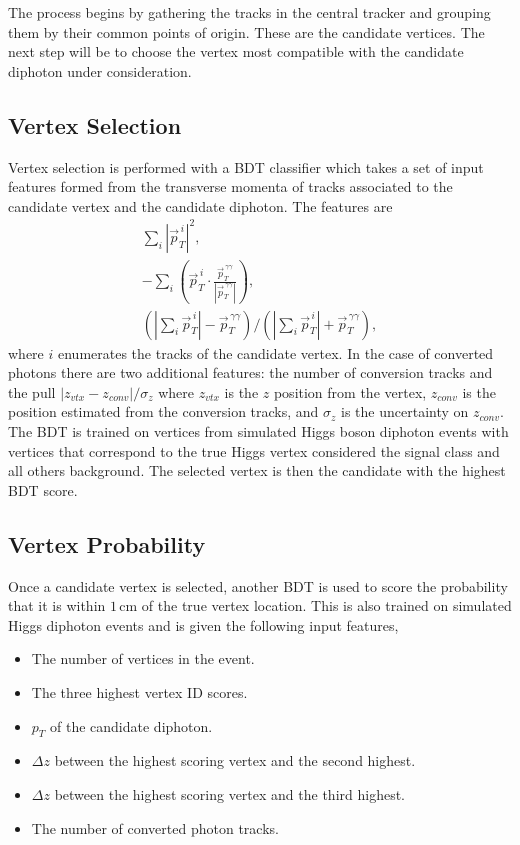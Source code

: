 The process begins by gathering the tracks in the central tracker and grouping them by their common points of origin. These are the candidate vertices. The next step will be to choose the vertex most compatible with the candidate diphoton under consideration.

\subsection{Vertex Selection}
Vertex selection is performed with a BDT classifier which takes a set of input features formed from the transverse momenta of tracks associated to the candidate vertex and the candidate diphoton. The features are
\begin{gather*}
    \sum_{i}|\vec{p}_{T}^{\,i}|^{2}, \\
    -\sum_{i}(\vec{p}_{T}^{\,i}\cdot\frac{\vec{p}_{T}^{\,\gamma\gamma}}{|\vec{p}_{T}^{\,\gamma\gamma}|}), \\
    (|\sum_{i}\vec{p}_{T}^{\,i}|-\vec{p}_{T}^{\,\gamma\gamma})/(|\sum_{i}\vec{p}_{T}^{\,i}|+\vec{p}_{T}^{\,\gamma\gamma}),
\end{gather*}
where $i$ enumerates the tracks of the candidate vertex. In the case of converted photons there are two additional features: the number of conversion tracks and the pull $|z_{vtx} - z_{conv}|/\sigma_{z}$ where $z_{vtx}$ is the $z$ position from the vertex, $z_{conv}$ is the position estimated from the conversion tracks, and $\sigma_z$ is the uncertainty on $z_{conv}$.
The BDT is trained on vertices from simulated Higgs boson diphoton events with vertices that correspond to the true Higgs vertex considered the signal class and all others background. The selected vertex is then the candidate with the highest BDT score. 


\subsection{Vertex Probability}
Once a candidate vertex is selected, another BDT is used to score the probability that it is within $1$\,cm of the true vertex location.   
This is also trained on simulated Higgs diphoton events and is given the following input features,
\begin{itemize}[noitemsep]
    \item The number of vertices in the event.
    \item The three highest vertex ID scores.
    \item $p_{T}$ of the candidate diphoton.
    \item $\Delta{z}$ between the highest scoring vertex and the second highest.
    \item $\Delta{z}$ between the highest scoring vertex and the third highest.
    \item The number of converted photon tracks.
\end{itemize}



